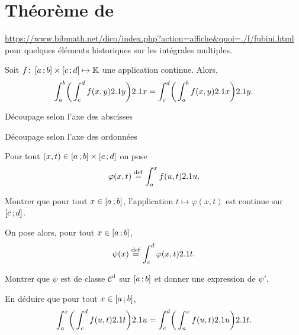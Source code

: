 \section{Théorème de }

\url{https://www.bibmath.net/dico/index.php?action=affiche&quoi=./f/fubini.html} pour quelques éléments historiques sur les intégrales multiples. 

\begin{theo}
    Soit $\fonctionligne[f]{\interff{a}{b} \times \interff{c}{d}}{\K}$ une application continue. Alors,
    \[
    \int_{a}^{b} \mathopen{}\bigg( \int_{c}^{d} f(x,y) \d y \bigg) \d x = \int_{c}^{d} \mathopen{}\bigg( \int_{a}^{b} f(x,y) \d x \bigg) \d y.
    \]
\end{theo}

\begin{marginfigure}[0cm]
    \centering
    
    \caption{Découpage selon l'axe des abscisses}
\end{marginfigure}
\begin{marginfigure}[5cm]
    \centering
    
    \caption{Découpage selon l'axe des ordonnées}
\end{marginfigure}

\begin{exercice}
    Pour tout $(x, t) \in \interff{a}{b} \times \interff{c}{d}$ on pose 
    $$\varphi(x, t) \defeq \int_{a}^{x} f(u, t) \d u.$$
    \begin{questions}
    \item Montrer que pour tout $x \in \interff{a}{b}$, l'application $t \mapsto \varphi(x, t)$ est continue sur $\interff{c}{d}$.
    \end{questions}

    On pose alors, pour tout $x  \in \interff{a}{b}$,
    $$\psi(x) \defeq \int_{c}^{d} \varphi(x, t) \d t.$$
    \begin{questions}[resume]
        \item Montrer que $\psi$ est de classe $\mathscr{C}^1$ sur $\interff{a}{b}$ et donner une expression de $\psi'$.
        \item En déduire que pour tout $x \in \interff{a}{b}$,
        \[
        \int_{a}^{x} \mathopen{}\bigg( \int_{c}^{d} f(u,t) \d t \bigg) \d u = \int_{c}^{d} \mathopen{}\bigg( \int_{a}^{x} f(u,t) \d u \bigg) \d t.
        \]
    \end{questions}
\end{exercice}

